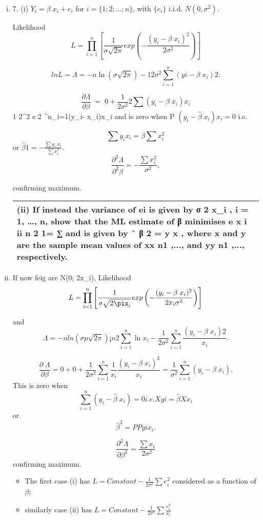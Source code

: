 \documentclass[a4paper,12pt]{article}
\begin{document}
\begin{enumerate}[(i)]
\item 7. (i) $Y_i = \beta\;x_i + e_i$ for $i = \{1; 2; \ldots; n\}$, with $\{e_i\}$ i.i.d. $N(0, \sigma^2)$.

Likelihood
\[ L = \prod^n_{i=1} \left[ \frac{1}{\sigma \sqrt{2\pi}} exp\left( - \frac{(y_i - \beta\;x_i)^2}{2\sigma^2}   \right)   \right] \]

\[lnL = \Lambda = -n \ln(\sigma \sqrt{2\pi}) - 1
2\sigma^2\sum^{n}_{i=1}(yi - \beta\;x_i)2.\]

\[
\frac{\partial \Lambda}{\partial \beta} \;=\; 0 + \frac{1}{2 \sigma^2}2 \sum (y_i - \beta\;x_i)x_i\]
1
2\sigma^2
¢ 2
\sum^{n}_{i=1}(y_{i}- \beta\;x_{i})x_{i}\] and is zero when
P
$(y_{i}- \hat{\beta}\;x_{i})x_{i} = 0$ i.e.

\[\sum y_{i}x_{i} = \beta \sum x_{i}^2\] or $\hat{\beta}1 =
- \frac{\sum y_i\;x_i}{\sum x_i^2}
.$
\[ \frac{\partial^2\Lambda}{\partial^2 \beta} = - \frac{\sum x_i^2}{\sigma^2}, \]

confirming maximum.
\newpage
  \begin{table}[ht!]
     \centering
     \begin{tabular}{|p{15cm}|}
     \hline  
(ii) If instead the variance of ei is given by 
σ
2
x_{i} ,  i = 1, …, n,  show that the
ML estimate of 
β
 minimises 
e x i ii n 2 1= ∑ and is given by
ˆ β 2 =   
y x
,
where x and y are the sample mean values of xx n1 ,..., and yy n1 ,..., respectively. 
\\ \hline 
\end{tabular}
\end{table}
\item  If now feig are N(0; \sigma2x_{i}),
Likelihood
\[ L = \prod^n_{i=1} \left[ \frac{1}{\sigma \sqrt{2\pix_i}} exp\left( - \frac{(y_i - \beta\;x_i)^2}{2x_i\sigma^2}   \right)   \right]\]

and\[ \Lambda = -n ln(\sigma
p
\sqrt{2\pi}) ¡ n
2
\sum^{n}_{i=1} \ln x_{i} -
\frac{1}{2\sigma^2} \sum^{n}_{i=1} \frac{(y_{i}- \beta\;x_{i})2}{x_{i}}.
\]

\[\frac{\partial\;\Lambda}{\partial \beta}
= 0 + 0 +
\frac{1}{2\sigma^2}
\sum^{n}_{i=1} \frac{1}{x_{i}}
\frac{(y_{i}- \beta\;x_{i})^2}{x_{i}} =
\frac{1}{\sigma^2} \sum^{n}_{i=1}(y_{i}- \beta\;x_{i}).\]
This is zero when\[
\sum^{n}_{i=1}(y_{i}- \hat{\beta}\;x_{i}) = 0 i.e.
X
yi = \hat{\beta}
X
x_{i}\] or\[ \hat{\beta}^2 =
P
Pyi
x_{i}
.
\]

\[\frac{\partial^2\Lambda}{\partial \beta^2} = \frac{\sum x_i}{2\sigma^2}\] confirming maximum.
\begin{itemize}
\item The first case (i) has $L = Constant - \frac{1}{2\sigma^2} \sum {e^2_i}$
considered as a function of $\beta$;
\item similarly case (ii) has $L = Constant - \frac{1}{2\sigma^2} \sum \frac{e^2_i}{x_{i}}$


\end{itemize}
\end{enumerate}
\end{document}
